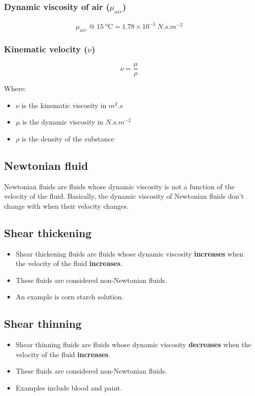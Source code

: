 \documentclass[11pt]{article}
\begin{document}
\subsubsection{Dynamic viscosity of air (\(\mu_{air}\))}
\label{sec:org594686d}
\[\mu_{air} \text{ @ } \qty{15}{\degreeCelsius} = 1.78 \times 10^{-5} \ \unit{N.s.m^{-2}}\]

\subsubsection{Kinematic velocity (\(\nu\))}
\label{sec:org966d413}
\[\nu = \frac{\mu}{\rho}\]

Where:
\begin{itemize}
\item \(\nu\) is the kinematic viscosity in \(\unit{m^2.s}\)
\item \(\mu\) is the dynamic viscosity in \(\unit{N.s.m^{-2}}\)
\item \(\rho\) is the density of the substance
\end{itemize}

\subsection{Newtonian fluid}
\label{sec:orgf69afdb}
Newtonian fluids are fluids whose dynamic viscosity is not a function of the velocity of the fluid. Basically, the dynamic viscosity of Newtonian fluids don't change with when their velocity changes.

\subsection{Shear thickening}
\label{sec:org9593c2a}
\begin{itemize}
\item Shear thickening fluids are fluids whose dynamic viscosity \textbf{increases} when the velocity of the fluid \textbf{increases}.
\item These fluids are considered non-Newtonian fluids.
\item An example is corn starch solution.
\end{itemize}

\subsection{Shear thinning}
\label{sec:org8fa32ad}
\begin{itemize}
\item Shear thinning fluids are fluids whose dynamic viscosity \textbf{decreases} when the velocity of the fluid \textbf{increases}.
\item These fluids are considered non-Newtonian fluids.
\item Examples include blood and paint.
\end{itemize}
\end{document}
